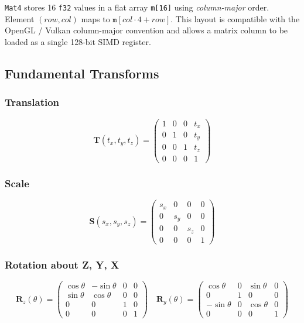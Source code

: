 \documentclass[12pt, a4paper]{report}
\theoremstyle{definition}
\theoremstyle{remark}
\begin{document}
\texttt{Mat4} stores 16 \texttt{f32} values in a flat array \texttt{m[16]}
using \emph{column-major} order. Element $(row, col)$ maps to
$\texttt{m}[col \cdot 4 + row]$. This layout is compatible with the
OpenGL / Vulkan column-major convention and allows a matrix column to
be loaded as a single 128-bit SIMD register.

\subsection{Fundamental Transforms}

\subsubsection{Translation}

\[
\mathbf{T}(t_x, t_y, t_z) =
\begin{pmatrix}
1 & 0 & 0 & t_x \\
0 & 1 & 0 & t_y \\
0 & 0 & 1 & t_z \\
0 & 0 & 0 & 1
\end{pmatrix}
\]

\subsubsection{Scale}

\[
\mathbf{S}(s_x, s_y, s_z) =
\begin{pmatrix}
s_x & 0   & 0   & 0 \\
0   & s_y & 0   & 0 \\
0   & 0   & s_z & 0 \\
0   & 0   & 0   & 1
\end{pmatrix}
\]

\subsubsection{Rotation about Z, Y, X}

\[
\mathbf{R}_z(\theta) =
\begin{pmatrix}
\cos\theta & -\sin\theta & 0 & 0 \\
\sin\theta &  \cos\theta & 0 & 0 \\
0          & 0           & 1 & 0 \\
0          & 0           & 0 & 1
\end{pmatrix}
\quad
\mathbf{R}_y(\theta) =
\begin{pmatrix}
 \cos\theta & 0 & \sin\theta & 0 \\
 0          & 1 & 0          & 0 \\
-\sin\theta & 0 & \cos\theta & 0 \\
 0          & 0 & 0          & 1
\end{pmatrix}
\]
\end{document}
